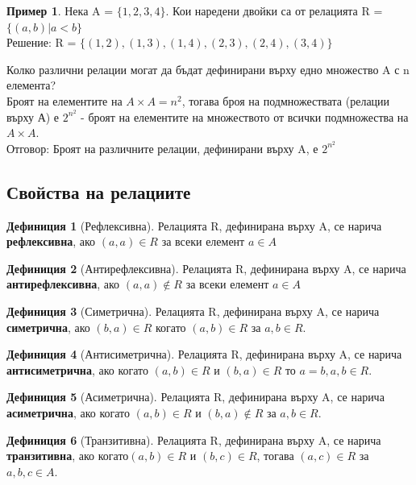 \documentclass[fleqn, 12pt]{article}
\theoremstyle{definition}
\newtheorem{example}{Пример}[subsection]
\newtheorem{definition}{Дефиниция}[subsection]
\begin{document}
\begin{example}
Нека A = $\{1, 2, 3, 4\}$. Кои наредени двойки са от релацията R = $\{(a, b) | a < b\}$ \\
Решение: R =  $\{(1, 2), (1, 3), (1, 4), (2, 3), (2, 4), (3, 4) \}$
\end{example}
Колко различни релации могат да бъдат дефинирани върху едно множество A с n елемента? \\
Броят на елементите на $A \times A = n^2$, тогава броя на подмножествата (релации върху А) е $2^{n^2}$ - броят на елементите на множеството от всички подмножества на $A \times A$.\\
Отговор: Броят на различните релации, дефинирани върху A, е $2^{n^2}$

\subsection{Свойства на релациите}
 
\begin{definition}[Рефлексивна]
Релацията R, дефинирана върху A, се нарича \textbf{рефлексивна}, ако $(a, a) \in R $ за всеки елемент $a \in A$
\end{definition}

\begin{definition}[Антирефлексивна]
Релацията R, дефинирана върху A, се нарича \textbf{антирефлексивна}, ако $(a, a) \notin R $ за всеки елемент $a \in A$
\end{definition}

\begin{definition}[Симетрична]
Релацията R, дефинирана върху A, се нарича \textbf{симетрична}, ако $(b, a) \in R$ когато $(a, b) \in R $ за $a, b \in R$. 
\end{definition}

\begin{definition}[Антисиметрична]
Релацията R, дефинирана върху A, се нарича \textbf{антисиметрична}, ако когато $(a, b) \in R $ и $(b, a) \in R$ то $a = b, a,b \in R$. 
\end{definition}

\begin{definition}[Асиметрична]
Релацията R, дефинирана върху A, се нарича \textbf{асиметрична}, ако когато $(a, b) \in R $ и $(b, a) \notin R$ за $a,b \in R$. 
\end{definition}

\begin{definition}[Транзитивна]
Релацията R, дефинирана върху A, се нарича \textbf{транзитивна}, ако когато$(a, b)\in R$ и $(b,c) \in R$, тогава $(a, c)\in R$ за $a, b, c \in A$. 
\end{definition}
\end{document}

